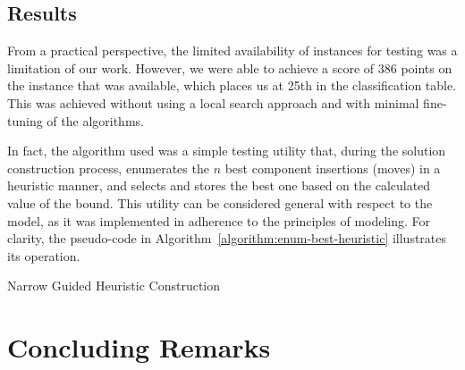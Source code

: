 \subsection{Results}
\label{section:data-center-results}

From a practical perspective, the limited availability of instances for testing
was a limitation of our work. However, we were able to achieve a score of 386
points on the instance that was available, which places us at 25th in the
classification table. This was achieved without using a local search approach
and with minimal fine-tuning of the algorithms.

In fact, the algorithm used was a simple testing utility that, during the
solution construction process, enumerates the $n$ best component insertions
(moves) in a heuristic manner, and selects and stores the best one based on the
calculated value of the bound. This utility can be considered general with
respect to the model, as it was implemented in adherence to the principles of
modeling. For clarity, the pseudo-code in Algorithm~\ref{algorithm:enum-best-heuristic}
illustrates its operation.

\begin{algorithm}[htb!]
  \DontPrintSemicolon
  \caption{Narrow Guided Heuristic Construction}
  \label{algorithm:enum-best-heuristic}
\end{algorithm}

\section{Concluding Remarks}
\label{section:data-center-remarks}

